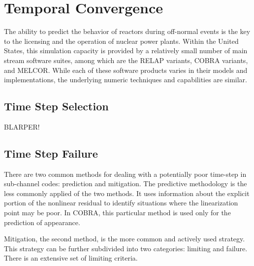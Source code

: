 \section{Temporal Convergence}
\label{sect:temporal_convergence}
The ability to predict the behavior of reactors during off-normal events is the key to the licensing and the operation of nuclear power plants.
Within the United States, this simulation capacity is provided by a relatively small number of main stream software suites, among which are the RELAP variants, COBRA variants, and MELCOR.
While each of these software products varies in their models and implementations, the underlying numeric techniques and capabilities are similar.

\subsection{Time Step Selection}
\label{subsect:time_step_selection}
BLARPER!
\subsection{Time Step Failure}
\label{subsect:time_step_failure}
There are two common methods for dealing with a potentially poor time-step in sub-channel codes: prediction and mitigation.
The predictive methodology is the less commonly applied of the two methods.
It uses information about the explicit portion of the nonlinear residual to identify situations where the linearization point may be poor.
In COBRA, this particular method is used only for the prediction of \ncg appearance.

Mitigation, the second method, is the more common and actively used strategy.
This strategy can be further subdivided into two categories: limiting and failure.
There is an extensive set of limiting criteria.
